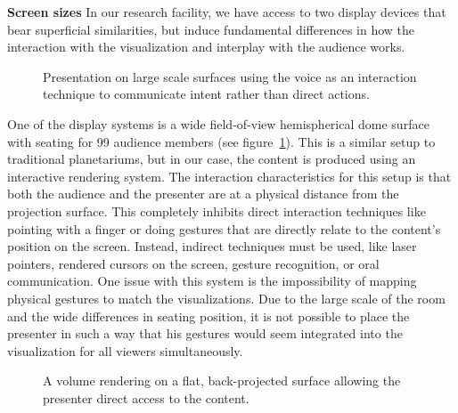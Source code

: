 \documentclass[review,journal]{vgtc}         %
\begin{document}
\noindent \textbf{Screen sizes} In our research facility, we have access to two display devices that bear superficial similarities, but induce fundamental differences in how the interaction with the visualization and interplay with the audience works.

\begin{figure}
	\centering
	\caption{Presentation on large scale surfaces using the voice as an interaction technique to communicate intent rather than direct actions.}
	\label{img:dome_presentation}
\end{figure}

One of the display systems is a wide field-of-view hemispherical dome surface with seating for 99 audience members (see figure~\ref{img:dome_presentation}).
This is a similar setup to traditional planetariums, but in our case, the content is produced using an interactive rendering system.
The interaction characteristics for this setup is that both the audience and the presenter are at a physical distance from the projection surface.
This completely inhibits direct interaction techniques like pointing with a finger or doing gestures that are directly relate to the content's position on the screen.
Instead, indirect techniques must be used, like laser pointers, rendered cursors on the screen, gesture recognition, or oral communication.
One issue with this system is the impossibility of mapping physical gestures to match the visualizations.
Due to the large scale of the room and the wide differences in seating position, it is not possible to place the presenter in such a way that his gestures would seem integrated into the visualization for all viewers simultaneously.

\begin{figure}
	\centering
	\caption{A volume rendering on a flat, back-projected surface allowing the presenter direct access to the content.}
	\label{img:vr_dvr}
\end{figure}
\end{document}
